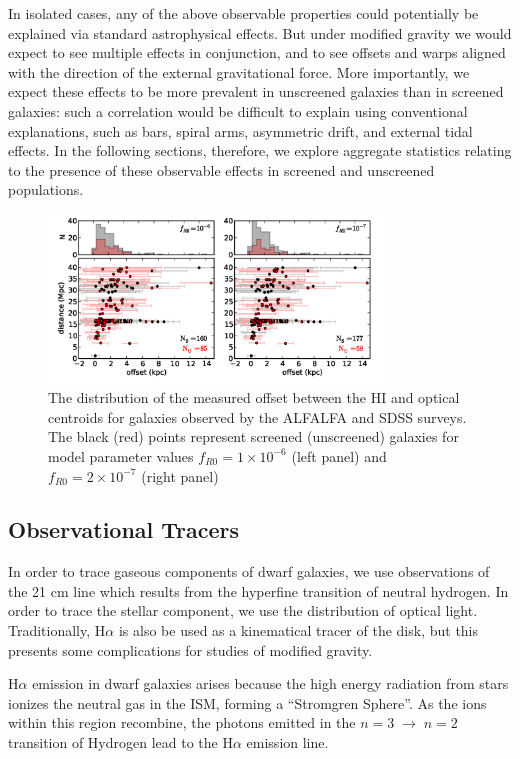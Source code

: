\documentclass[useAMS,usenatbib,twocolumn]{mn2e}
\newcommand{\ha}{H$\alpha$}
\begin{document}
In isolated cases,
any of the above observable properties could potentially be explained via
standard astrophysical effects.  But under modified gravity we would expect
to see multiple effects in conjunction, and to see offsets and warps
aligned with the direction of the external gravitational force.
More importantly, we expect these effects to be more prevalent
in unscreened galaxies than in screened galaxies: such a correlation
would be difficult to explain using conventional explanations,
such as bars, spiral arms, asymmetric drift, and external tidal effects.
In the following sections, therefore, we explore aggregate statistics
relating to the presence of these observable effects in screened and
unscreened populations.  

\begin{figure}
\centering
\includegraphics[width=0.8\textwidth]{figures/Offset_HI_optical_scatter_jake.png}
\caption{The distribution of the measured offset between the HI and
optical centroids for galaxies observed by the ALFALFA and SDSS surveys.
The black (red) points represent screened (unscreened) galaxies for model
parameter values 
$f_{R0}=1\times10^{-6}$ (left panel) and $f_{R0}=2\times10^{-7}$ (right panel)}
\label{fig:offset}
\end{figure}

\subsection{Observational Tracers}
\label{sec:halpha}

In order to trace gaseous components of dwarf galaxies,
we use observations of the 21 cm line which results from the hyperfine
transition of neutral hydrogen.
In order to trace the stellar component, we use the distribution of optical
light.  Traditionally, \ha{} is also be used as a kinematical tracer
of the disk, but this presents some complications for studies of
modified gravity.

\ha{} emission in dwarf galaxies arises because
the high energy radiation from stars ionizes the neutral gas in the ISM,
forming a  ``Stromgren Sphere''.
As the ions within this region recombine,
the photons emitted in the $n=3\;\to\;n=2$ transition
of Hydrogen lead to the \ha{} emission line.
\end{document}
